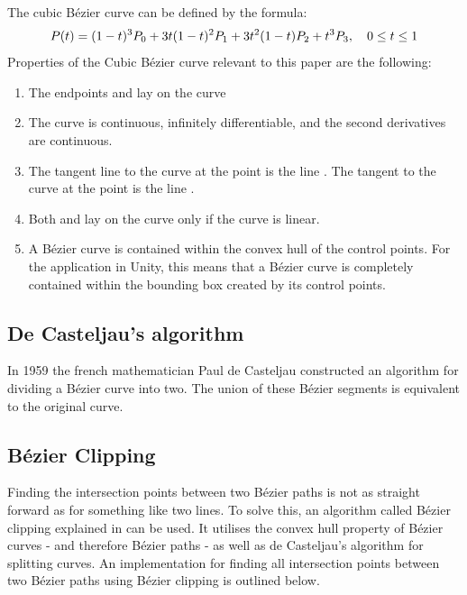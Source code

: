     
        The cubic Bézier curve can be defined by the formula\cite{Cubic-Bézier-Curves}: 
        $$
            P(t) = (1-t)^3P_0 + 3t(1 - t)^2P_1 + 3t^2(1 - t)P_2 + t^3P_3 , \quad 0 \le t \le 1
        $$
        Properties of the Cubic Bézier curve relevant to this paper are the following:
        \begin{enumerate}
            \item The endpoints  and  lay on the curve
            \item The curve is continuous, infinitely differentiable, and the second derivatives are continuous.
            \item The tangent line to the curve at the point  is the line . The tangent to the
        curve at the point  is the line .
            \item Both  and  lay on the curve only if the curve is linear.
            \item A Bézier curve is contained within the convex hull of the control points. For the application in Unity, this means that a Bézier curve is completely contained within the bounding box created by its control points.
        \end{enumerate}


    \subsection{De Casteljau's algorithm}
        In 1959 the french mathematician Paul de Casteljau constructed an algorithm for dividing a Bézier curve into two. The union of these Bézier segments is equivalent to the original curve.
    
    \subsection{Bézier Clipping}
        Finding the intersection points between two Bézier paths is not as straight forward as for something like two lines. To solve this, an algorithm called Bézier clipping explained in \cite{bezier-clipping} can be used. It utilises the convex hull property of Bézier curves - and therefore Bézier paths - as well as de Casteljau's algorithm for splitting curves. An implementation for finding all intersection points between two Bézier paths using Bézier clipping is outlined below.

